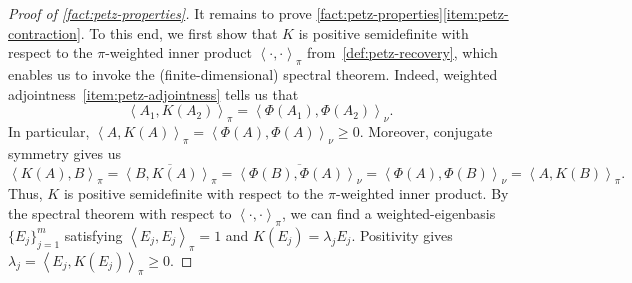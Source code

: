 \documentclass[11pt]{article}
\renewcommand{\geq}{\geqslant}
\theoremstyle{remark}
\newcommand{\inner}[2]{\left\langle #1, #2\right\rangle}
\begin{document}
\begin{proof}[Proof of \cref{fact:petz-properties}]
It remains to prove \cref{fact:petz-properties}\ref{item:petz-contraction}. To this end, we first show that $K$ is positive semidefinite with respect to the $\pi$-weighted inner product $\inner{\cdot}{\cdot}_\pi$ from~\cref{def:petz-recovery}, which enables us to invoke the (finite-dimensional) spectral theorem. Indeed, weighted adjointness~\ref{item:petz-adjointness} tells us that
\begin{equation*}
\inner{A_1}{K(A_2)}_\pi
= \inner{\Phi(A_1)}{\Phi(A_2)}_\nu.
\end{equation*}
In particular, $\inner{A}{K(A)}_\pi = \inner{\Phi(A)}{\Phi(A)}_\nu \geq 0$. Moreover, conjugate symmetry gives us
\begin{equation*}
\inner{K(A)}{B}_\pi
= \overline{\inner{B}{K(A)}_\pi}
= \overline{\inner{\Phi(B)}{\Phi(A)}_\nu}
= \inner{\Phi(A)}{\Phi(B)}_\nu
= \inner{A}{K(B)}_\pi.
\end{equation*}
Thus, $K$ is positive semidefinite with respect to the $\pi$-weighted inner product. By the spectral theorem with respect to $\inner{\cdot}{\cdot}_\pi$, we can find a weighted-eigenbasis $\{E_j\}_{j=1}^m$ satisfying $\inner{E_j}{E_j}_\pi = 1$ and $K(E_j) = \lambda_jE_j$. Positivity gives $\lambda_j = \inner{E_j}{K(E_j)}_\pi \geq 0$.


\end{proof}
\end{document}
